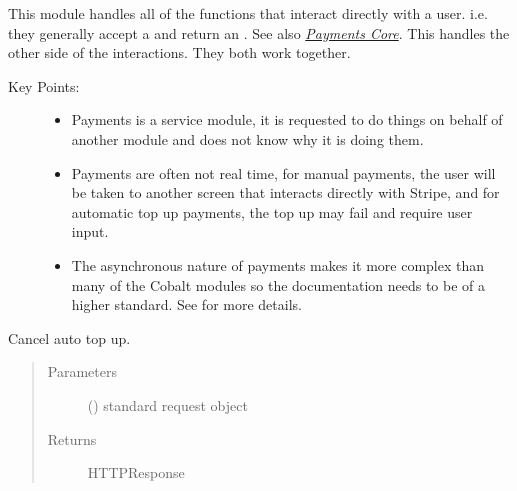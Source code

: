 \documentclass[letterpaper,10pt,english]{sphinxmanual}
\begin{document}
This module handles all of the functions that interact directly with
a user. i.e. they generally accept a  and return an
.
See also {\hyperref[\detokenize{payments:module-payments.core}]{\emph{Payments Core}}}. This handles the other side of the interactions.
They both work together.
\begin{description}
\item[{Key Points:}] \leavevmode\begin{itemize}
\item {} 
Payments is a service module, it is requested to do things on behalf of
another module and does not know why it is doing them.

\item {} 
Payments are often not real time, for manual payments, the user will
be taken to another screen that interacts directly with Stripe, and for
automatic top up payments, the top up may fail and require user input.

\item {} 
The asynchronous nature of payments makes it more complex than many of
the Cobalt modules so the documentation needs to be of a higher standard.
See  for more details.

\end{itemize}

\end{description}

\begin{fulllineitems}
\label{\detokenize{payments:payments.views.cancel_auto_top_up}}
Cancel auto top up.
\begin{quote}\begin{description}
\item[{Parameters}] \leavevmode
{} () \textendash{} standard request object

\item[{Returns}] \leavevmode
HTTPResponse

\end{description}\end{quote}

\end{fulllineitems}
\end{document}
